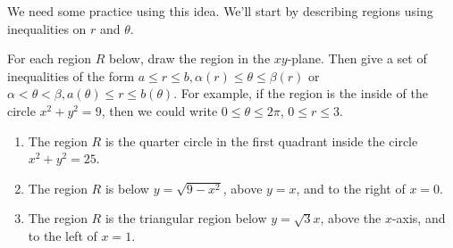 We need some practice using this idea. We'll start by describing regions using inequalities on $r$ and $\theta$.  




\begin{problem}
For each region $R$ below, draw the region in the $xy$-plane. Then give a set of inequalities of the form $a\leq r\leq b, \alpha(r)\leq \theta \leq \beta(r)$ or $\alpha<\theta<\beta, a(\theta)\leq r\leq b(\theta)$. For example, if the region is the inside of the circle $x^2+y^2=9$, then we could write $0\leq \theta\leq 2\pi$, $0\leq r\leq 3$. 
\begin{enumerate}
 \item The region $R$ is the quarter circle in the first quadrant inside the circle $x^2+y^2=25$.
 \item The region $R$ is below $y=\sqrt{9-x^2}$, above $y=x$, and to the right of $x=0$.  
 \item The region $R$ is the triangular region below $y=\sqrt 3 x$, above the $x$-axis, and to the left of $x=1$. 
\end{enumerate}
\end{problem}



